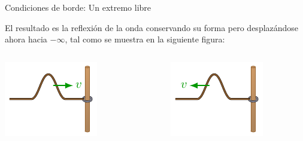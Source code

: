 \documentclass[11pt,handout,aspectratio=1610]{beamer}
\begin{document}
\begin{frame}{Condiciones de borde: Un extremo libre}
    
    El resultado es la reflexión de la onda conservando su forma pero desplazándose ahora hacia $-\infty$, tal como se muestra en la siguiente figura:

    \begin{columns}
        \begin{column}{0.4\textwidth}
            \includegraphics[width=\textwidth]{../figs/waves_reflection_transmission-3.pdf}
        \end{column}
        ~
        \begin{column}{0.4\textwidth}
            \includegraphics[width=\textwidth]{../figs/waves_reflection_transmission-4.pdf}
        \end{column}
    \end{columns}
    
\end{frame}
\end{document}
